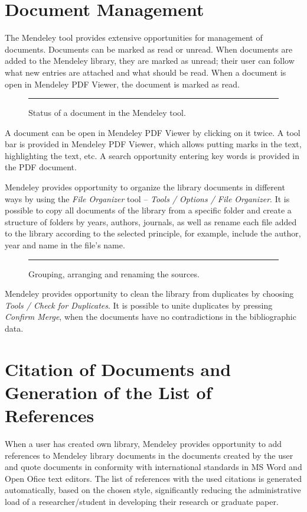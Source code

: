 \section{Document Management}

The Mendeley tool provides extensive opportunities for management of documents. Documents can be marked as read or unread. When documents are added to the Mendeley library, they are marked as unread; their user can follow what new entries are attached and what should be read. When a document is open in Mendeley PDF Viewer, the document is marked as read.

\begin{figure}[ht]
  \centering
  \rule{0.8\linewidth}{0.35\linewidth}
  \caption{Status of a document in the Mendeley tool.}
  \label{fig:mend-status}
\end{figure}

A document can be open in Mendeley PDF Viewer by clicking on it twice. A tool bar is provided in Mendeley PDF Viewer, which allows putting marks in the text, highlighting the text, etc. A search opportunity entering key words is provided in the PDF document.

Mendeley provides opportunity to organize the library documents in different ways by using the \emph{File Organizer} tool – \emph{Tools / Options / File Organizer}. It is possible to copy all documents of the library from a specific folder and create a structure of folders by years, authors, journals, as well as rename each file added to the library according to the selected principle, for example, include the author, year and name in the file’s name.

\begin{figure}[ht]
  \centering
  \rule{0.8\linewidth}{0.35\linewidth}
  \caption{Grouping, arranging and renaming the sources.}
  \label{fig:mend-file-organizer}
\end{figure}

Mendeley provides opportunity to clean the library from duplicates by choosing \emph{Tools / Check for Duplicates}. It is possible to unite duplicates by pressing \emph{Confirm Merge}, when the documents have no contradictions in the bibliographic data.

\section{Citation of Documents and Generation of the List of References}

When a user has created own library, Mendeley provides opportunity to add references to Mendeley library documents in the documents created by the user and quote documents in conformity with international standards in MS Word and Open Ofice text editors. The list of references with the used citations is generated automatically, based on the chosen style, significantly reducing the administrative load of a researcher/student in developing their research or graduate paper.

